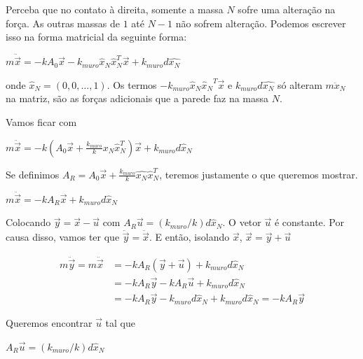 Perceba que no contato à direita, somente a massa $N$ sofre uma alteração na força. As outras massas de $1$ até $N-1$ não sofrem alteração.
Podemos escrever isso na forma matricial da seguinte forma:
\begin{center}
    $m \ddot{\vec{x}} = -k A_0 \vec{x} -k_{muro} \hat{x}_N \hat{x}_N^T \vec{x}+k_{muro} d \hat{x_N}$
\end{center}
onde $\hat{x}_N = (0,0, \dots, 1)$.
Os termos $-k_{muro} \hat{x}_N {\hat{x}_N}^T \vec{x}$ e $k_{muro} d \hat{x_N}$ só alteram $m \ddot{x}_N$ na matriz, são as forças adicionais que a parede faz na massa $N$.

Vamos ficar com

\begin{center}
    $m \ddot{\vec{x}} = -k (A_0 \vec{x}+\frac{k_{muro}}{k} \hat{x_N} \hat{x}_N ^ T) \vec{x} + k_{muro} d \hat{x}_N$
\end{center}
Se definimos $A_R = A_0 \vec{x}+\frac{k_{muro}}{k} \hat{x_N} \hat{x}_N ^ T$, teremos justamente o que queremos mostrar.
\begin{center}
    $m \ddot{\vec{x}} = -k A_R \vec{x} + k_{muro} d \hat{x}_N$
\end{center}

Colocando $\vec{y} = \vec{x} - \vec{u}$ com $A_R \vec{u} = (k_{muro}/k) d \hat{x}_N$. O vetor $\vec{u}$ é constante. 
Por causa disso, vamos ter que $\ddot{\vec{y}} = \ddot{\vec{x}}$.
E então, isolando $\vec{x}$, $\vec{x} = \vec{y} + \vec{u}$ 

\begin{align*}
    m \ddot{\vec{y}} = m \ddot{\vec{x}} &= -k A_R (\vec{y}+\vec{u}) +k_{muro} d \hat{x}_N \\
    &= -k A_R \vec{y} -k A_R \vec{u} +k_{muro} d \hat{x}_N \\
    &=-k A_R \vec{y} - k_{muro} d \hat{x}_N + k_{muro} d \hat{x}_N = -k A_R \vec{y}
\end{align*}

Queremos encontrar $\vec{u}$ tal que
\begin{center}
    $A_R \vec{u} = (k_{muro}/k) d \hat{x}_N$
\end{center}

